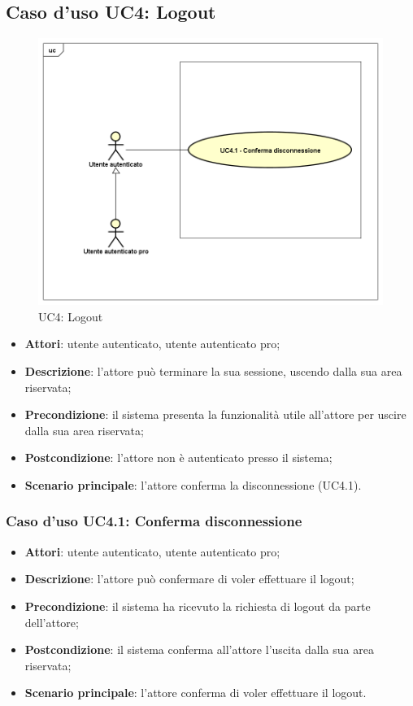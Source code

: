 \newpage
\subsection{Caso d'uso UC4: Logout}
	\label{UC4}
	\begin{figure}[ht]
		\centering
			\includegraphics[scale=0.5,keepaspectratio]{UML/UC4.png}
		\caption{UC4: Logout}
	\end{figure}
	\FloatBarrier
	\begin{itemize}
		\item
			\textbf{Attori}: utente autenticato, utente autenticato pro;
		\item		
			\textbf{Descrizione}: l'attore può terminare la sua sessione, uscendo dalla sua area riservata;
		\item
			\textbf{Precondizione}: il sistema presenta la funzionalità utile all'attore per uscire dalla sua area riservata;
		\item
			\textbf{Postcondizione}: l'attore non è autenticato presso il sistema;
		\item
			\textbf{Scenario principale}: l'attore conferma la disconnessione (UC4.1).
	\end{itemize}

\subsubsection{Caso d'uso UC4.1: Conferma disconnessione}
	\begin{itemize}
		\item
			\textbf{Attori}: utente autenticato, utente autenticato pro;
		\item
			\textbf{Descrizione}: l'attore può confermare di voler effettuare il logout;
 		\item
			\textbf{Precondizione}: il sistema ha ricevuto la richiesta di logout da parte dell'attore;
		\item
			\textbf{Postcondizione}: il sistema conferma all'attore l'uscita dalla sua area riservata;
		\item
			\textbf{Scenario principale}: l'attore conferma di voler effettuare il logout.
	\end{itemize}		
	